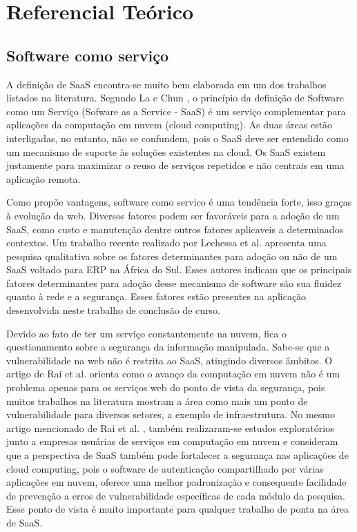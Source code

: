 \chapter{Referencial Teórico}

 \section{Software como serviço}\label{sec:saas}


A definição de SaaS encontra-se muito bem elaborada em um dos trabalhos listados na literatura. Segundo La e Chun \citep{La2009Systematic}, o princípio da definição de Software como um Serviço (Sofware as a Service - SaaS) é um serviço complementar para aplicações da computação em nuvem (cloud computing). As duas áreas estão interligadas, no entanto, não se confundem, pois o SaaS deve ser entendido como um mecanismo de suporte às soluções existentes na cloud. Os SaaS existem justamente para maximizar o reuso de serviços repetidos e não centrais em uma aplicação remota.


Como propõe vantagens, software como servico é uma tendência forte, isso graças à evolução da web. Diversos fatores podem ser favoráveis para a adoção de um SaaS, como custo e manutenção dentre outros fatores aplicaveis a determinados contextos. Um trabalho recente realizado por Lechessa et al. \cite{LechesaSS11} apresenta uma pesquisa qualitativa sobre os fatores determinantes para adoção ou não de um SaaS voltado para ERP na África do Sul. Esses autores indicam que os principais fatores determinantes para adoção desse mecanismo de software são sua fluidez quanto à rede e a segurança. Esses fatores estão presentes na aplicação desenvolvida neste trabalho de conclusão de curso.
 

Devido ao fato de ter um serviço constantemente na nuvem, fica o questionamento sobre a segurança da informação manipulada. Sabe-se que a vulnerabilidade na web não é restrita ao SaaS, atingindo diversos âmbitos. O artigo de Rai et al. \cite{journals/corr/RaiSM13} orienta como o avanço da computação em nuvem não é um problema apenas para os serviços web do ponto de vista da segurança, pois muitos trabalhos na literatura mostram a área como mais um ponto de vulnerabilidade para diversos setores, a exemplo de infraestrutura. No mesmo artigo mencionado de Rai et al. \cite{journals/corr/RaiSM13}, também realizaram-se estudos exploratórios junto a empresas usuárias de serviços em computação em nuvem e consideram que a perspectiva de SaaS também pode fortalecer a segurança nas aplicações de cloud computing, pois o software de autenticação compartilhado por várias aplicações em nuvem, oferece uma melhor padronização e consequente facilidade de prevenção a erros de vulnerabilidade específicas de cada módulo da pesquisa. Esse ponto de vista é muito importante para qualquer trabalho de ponta na área de SaaS.


